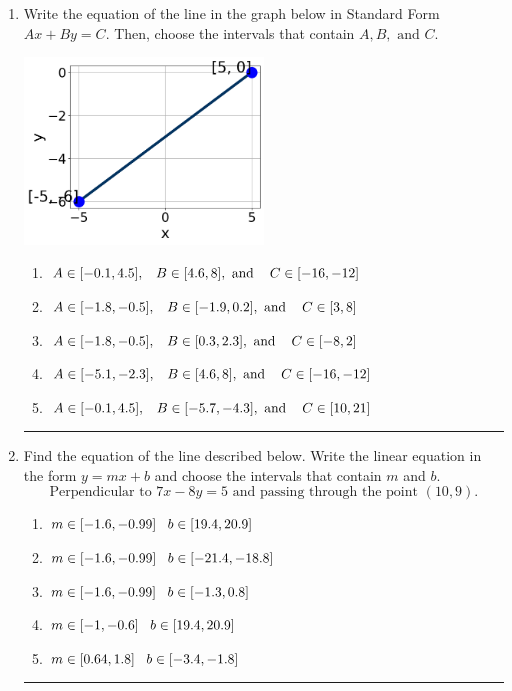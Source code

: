 \documentclass[14pt]{extbook}
\newcommand{\litem}[1]{\item#1\hspace*{-1cm}\rule{\textwidth}{0.4pt}}
\begin{document}
\begin{enumerate}
\litem{
Write the equation of the line in the graph below in Standard Form $Ax+By=C$. Then, choose the intervals that contain $A, B, \text{ and } C$.
\begin{center}
    \includegraphics[width=0.5\textwidth]{../Figures/linearGraphToStandardA.png}
\end{center}
\begin{enumerate}[label=\Alph*.]
\item \( A \in [-0.1, 4.5], \hspace{3mm} B \in [4.6, 8], \text{ and } \hspace{3mm} C \in [-16, -12] \)
\item \( A \in [-1.8, -0.5], \hspace{3mm} B \in [-1.9, 0.2], \text{ and } \hspace{3mm} C \in [3, 8] \)
\item \( A \in [-1.8, -0.5], \hspace{3mm} B \in [0.3, 2.3], \text{ and } \hspace{3mm} C \in [-8, 2] \)
\item \( A \in [-5.1, -2.3], \hspace{3mm} B \in [4.6, 8], \text{ and } \hspace{3mm} C \in [-16, -12] \)
\item \( A \in [-0.1, 4.5], \hspace{3mm} B \in [-5.7, -4.3], \text{ and } \hspace{3mm} C \in [10, 21] \)

\end{enumerate} }
\litem{
Find the equation of the line described below. Write the linear equation in the form $ y=mx+b $ and choose the intervals that contain $m$ and $b$.\[ \text{Perpendicular to } 7 x - 8 y = 5 \text{ and passing through the point } (10, 9). \]\begin{enumerate}[label=\Alph*.]
\item \( m \in [-1.6, -0.99] \hspace*{3mm} b \in [19.4, 20.9] \)
\item \( m \in [-1.6, -0.99] \hspace*{3mm} b \in [-21.4, -18.8] \)
\item \( m \in [-1.6, -0.99] \hspace*{3mm} b \in [-1.3, 0.8] \)
\item \( m \in [-1, -0.6] \hspace*{3mm} b \in [19.4, 20.9] \)
\item \( m \in [0.64, 1.8] \hspace*{3mm} b \in [-3.4, -1.8] \)


\end{enumerate}}
\end{enumerate}
\end{document}
